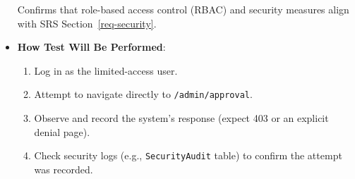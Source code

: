 \documentclass[12pt, titlepage]{article}
\begin{document}
\begin{itemize}
    Confirms that role-based access control (RBAC) and security measures align with SRS Section~\ref{req-security}.
    \item \textbf{How Test Will Be Performed}:
    \begin{enumerate}
        \item Log in as the limited-access user.
        \item Attempt to navigate directly to \texttt{/admin/approval}.
        \item Observe and record the system’s response (expect 403 or an explicit denial page).
        \item Check security logs (e.g., \texttt{SecurityAudit} table) to confirm the attempt was recorded.
    \end{enumerate}
\end{itemize}
\end{document}

